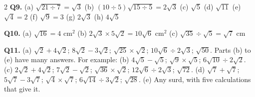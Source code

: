 \documentclass[12pt,a4paper]{article}
\newcommand{\ealkey}[1]{\textcolor{ealkeycolour}{#1}}
\begin{document}
{\begin{multicols}{2}
\textbf{Q9.} (a) $\sqrt{21\div7}=\sqrt{3}$ \quad
(b) $(10\div5)\sqrt{15\div5}=2\sqrt{3}$ \quad (c) $\sqrt{5}$ \quad
(d) $\sqrt{11}$ \quad (e) $\sqrt{4}=2$ \quad (f) $\sqrt{9}=3$ \quad
(g) $2\sqrt{3}$ \quad (h) $4\sqrt{5}$

\textbf{Q10.} (a) $\sqrt{16}=4$ cm$^2$ \quad
(b) $2\sqrt{3}\times5\sqrt{2}=10\sqrt{6}$ cm$^2$ \quad
(c) $\sqrt{35}\div\sqrt{5}=\sqrt{7}$ cm

\textbf{Q11.} (a) $\sqrt{2}+4\sqrt{2}$; \; $8\sqrt{2}-3\sqrt{2}$; \;
$\sqrt{25}\times\sqrt{2}$; \; $10\sqrt{6}\div2\sqrt{3}$; \; $\sqrt{50}$.
\quad Parts (b) to (e) have many answers. For example:
(b) $4\sqrt{5}-\sqrt{5}$; \; $\sqrt{9}\times\sqrt{5}$; \;
$6\sqrt{10}\div2\sqrt{2}$. \quad
(c) $2\sqrt{2}+4\sqrt{2}$; \; $7\sqrt{2}-\sqrt{2}$; \;
$\sqrt{36}\times\sqrt{2}$; \; $12\sqrt{6}\div2\sqrt{3}$; \; $\sqrt{72}$.
\quad
(d) $\sqrt{7}+\sqrt{7}$; \; $5\sqrt{7}-3\sqrt{7}$; \;
$\sqrt{4}\times\sqrt{7}$; \; $6\sqrt{14}\div3\sqrt{2}$; \; $\sqrt{28}$.
\quad (e) Any \ealkey{surd}, with five calculations that give it.

\end{multicols}
}
\end{document}
